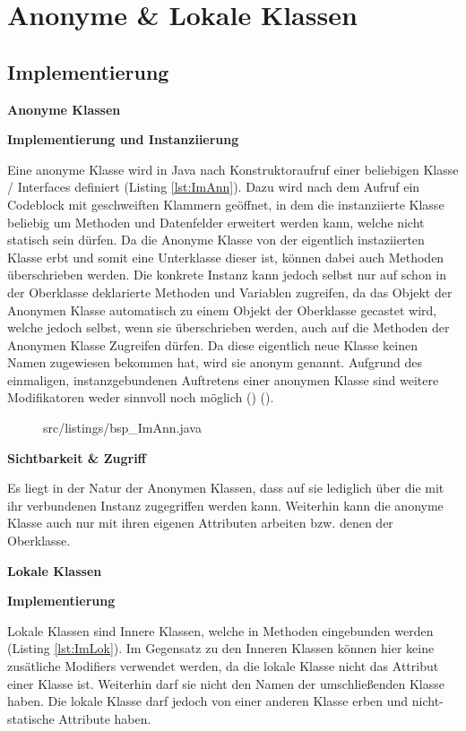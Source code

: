 \section{Anonyme \& Lokale Klassen}
\subsection {Implementierung}

{\Large \bf Anonyme Klassen}

{\bf Implementierung und Instanziierung}

Eine anonyme Klasse wird in Java nach Konstruktoraufruf einer beliebigen Klasse / Interfaces definiert (Listing \ref{lst:ImAnn}).
Dazu wird nach dem Aufruf ein Codeblock mit geschweiften Klammern geöffnet, in dem die instanziierte Klasse beliebig um Methoden und Datenfelder erweitert werden kann, welche nicht statisch sein dürfen.
Da die Anonyme Klasse von der eigentlich instaziierten Klasse erbt und somit eine Unterklasse dieser ist, können dabei auch Methoden überschrieben werden.
Die konkrete Instanz kann jedoch selbst nur auf schon in der Oberklasse deklarierte Methoden und Variablen zugreifen, da das Objekt der Anonymen Klasse automatisch zu einem Objekt der Oberklasse gecastet wird, welche jedoch selbst, wenn sie überschrieben werden, auch auf die Methoden der Anonymen Klasse Zugreifen dürfen.
Da diese eigentlich neue Klasse keinen Namen zugewiesen bekommen hat, wird sie anonym genannt.
Aufgrund des einmaligen, instanzgebundenen Auftretens einer anonymen Klasse sind weitere Modifikatoren weder sinnvoll noch möglich (\cite{goll2013java}) (\cite{Oracle:JLS9}).

\begin{figure}[h]
\lstset{language=Java}
 {src/listings/bsp_ImAnn.java}
\end{figure}

{\bf Sichtbarkeit \& Zugriff}

Es liegt in der Natur der Anonymen Klassen, dass auf sie lediglich über die mit ihr verbundenen Instanz zugegriffen werden kann.
Weiterhin kann die anonyme Klasse auch nur mit ihren eigenen Attributen arbeiten bzw. denen der Oberklasse.

\newpage

{\Large \bf Lokale Klassen}

{\bf Implementierung}

Lokale Klassen sind Innere Klassen, welche in Methoden eingebunden werden (Listing \ref{lst:ImLok}).
Im Gegensatz zu den Inneren Klassen können hier keine zusätliche Modifiers verwendet werden, da die lokale Klasse nicht das Attribut einer Klasse ist.
Weiterhin darf sie nicht den Namen der umschließenden Klasse haben.
Die lokale Klasse darf jedoch von einer anderen Klasse erben und nicht-statische Attribute haben.

